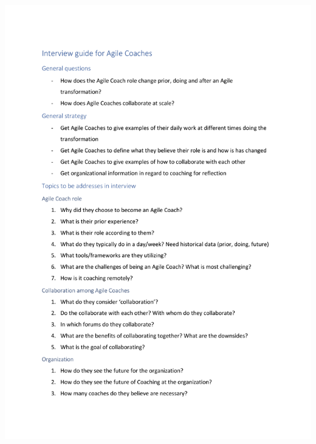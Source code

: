 \documentclass[11pt,a4paper]{report}
\begin{document}
\includegraphics[scale=1, page=2]{acInterview.pdf}

\restoregeometry
\end{document}
